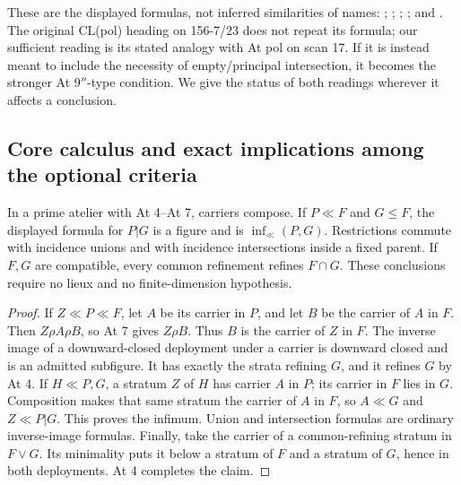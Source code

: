 These are the displayed formulas, not inferred similarities of names:
;
;
;
; and
.
The original CL(pol) heading on 156-7/23 does not repeat its formula;
our sufficient reading is its stated analogy with At pol on scan 17.
If it is instead meant to include the necessity of empty/principal
intersection, it becomes the stronger At \(9''\)-type condition. We
give the status of both readings wherever it affects a conclusion.

\subsection{Core calculus and exact implications among the optional criteria}

\begin{lemma}
\label{SA21-B-carrier-calculus}
In a prime atelier with At 4--At 7, carriers compose. If \(P\ll F\)
and \(G\leq F\), the displayed formula for \(P|G\) is a figure and
is \(\inf_{\ll}(P,G)\). Restrictions commute with incidence unions
and with incidence intersections inside a fixed parent. If \(F,G\)
are compatible, every common refinement refines \(F\cap G\).
These conclusions require no lieux and no finite-dimension hypothesis.
\end{lemma}

\begin{proof}
If \(Z\ll P\ll F\), let \(A\) be its carrier in \(P\), and let \(B\)
be the carrier of \(A\) in \(F\). Then \(Z\rho A\rho B\), so At 7
gives \(Z\rho B\). Thus \(B\) is the carrier of \(Z\) in \(F\).
The inverse image of a downward-closed deployment under a carrier is
downward closed and is an admitted subfigure. It has exactly the
strata refining \(G\), and it refines \(G\) by At 4.
If \(H\ll P,G\), a stratum \(Z\) of \(H\) has carrier \(A\) in \(P\);
its carrier in \(F\) lies in \(G\). Composition makes that same
stratum the carrier of \(A\) in \(F\), so \(A\ll G\) and
\(Z\ll P|G\). This proves the infimum.
Union and intersection formulas are ordinary inverse-image formulas.
Finally, take the carrier of a common-refining stratum in \(F\vee G\).
Its minimality puts it below a stratum of \(F\) and a stratum of \(G\),
hence in both deployments. At 4 completes the claim.
\end{proof}

